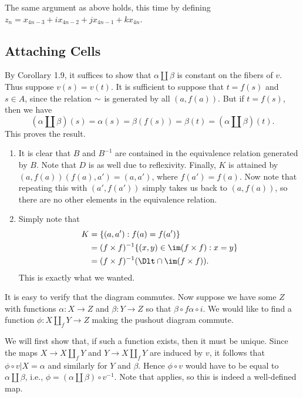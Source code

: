 \documentclass[../../solutions.tex]{subfiles}
\begin{document}
\begin{exercise} \leavevmode
The same argument as above holds, this time by defining $z_n=x_{4n-3}+ix_{4n-2}+jx_{4n-1}+kx_{4n}$.
\end{exercise}

\subsection{Attaching Cells}
\begin{exercise} \leavevmode
By Corollary 1.9, it suffices to show that $\alpha\amalg\beta$ is constant on the fibers of $v$.
Thus suppose $v(s)=v(t)$.
It is sufficient to suppose that $t=f(s)$ and $s\in A$, since the relation ${\sim}$ is generated by all $(a,f(a))$.
But if $t=f(s)$, then we have
\[(\alpha\amalg\beta)(s)=\alpha(s)=\beta(f(s))=\beta(t)=(\alpha\amalg\beta)(t).\]
This proves the result.
\end{exercise}

\begin{exercise} \leavevmode
\begin{enumerate}
\item
It is clear that $B$ and $B^{-1}$ are contained in the equivalence relation generated by $B$.
Note that $D$ is as well due to reflexivity.
Finally, $K$ is attained by $(a,f(a))(f(a),a')=(a,a')$, where $f(a')=f(a)$.
Now note that repeating this with $(a',f(a'))$ simply takes us back to $(a,f(a))$, so there are no other elements in the equivalence relation.

\item
Simply note that
\begin{align*}
K&=\{(a,a'):f(a)=f(a')\}\\&=(f\times f)^{-1}\{(x,y)\in\im(f\times f):x=y\}\\&=(f\times f)^{-1}(\Dlt\cap\im(f\times f)).
\end{align*}
This is exactly what we wanted.
\end{enumerate}
\end{exercise}

\begin{exercise} \leavevmode
It is easy to verify that the diagram commutes.
Now suppose we have some $Z$ with functions $\alpha:X\to Z$ and $\beta:Y\to Z$ so that $\beta\circ f\alpha\circ i$.
We would like to find a function $\phi:X\amalg_fY\to Z$ making the pushout diagram commute.

We will first show that, if such a function exists, then it must be unique.
Since the maps $X\to X\amalg_fY$ and $Y\to X\amalg_fY$ are induced by $v$, it follows that $\phi\circ v|X=\alpha$ and similarly for $Y$ and $\beta$.
Hence $\phi\circ v$ would have to be equal to $\alpha\amalg\beta$, i.e., $\phi=(\alpha\amalg\beta)\circ v^{-1}$.
Note that  applies, so this is indeed a well-defined map.
\end{exercise}
\end{document}
